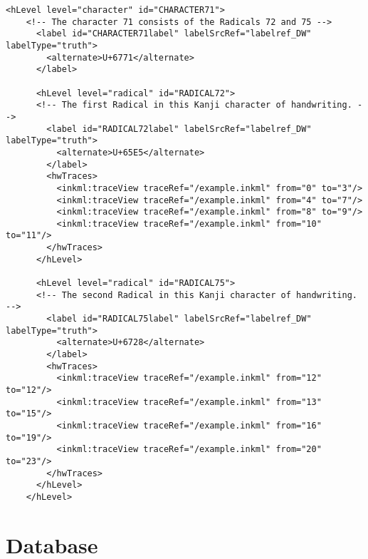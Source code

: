 \begin{xmlcode}
  \begin{lstlisting}[emph={hLevel,hwTraces,label,alternative},
                     emphstyle=\color{blue}\textbf,
                     emph={[2]level,labelSrcRef,labelType,traceRef,from,to},
                     emphstyle={[2]\color{red}},
                     caption={A sample of how a stroke could be represented},
                     label=lst:charaterdataformat]
    <hLevel level="character" id="CHARACTER71">
    <!-- The character 71 consists of the Radicals 72 and 75 -->
      <label id="CHARACTER71label" labelSrcRef="labelref_DW" labelType="truth">
        <alternate>U+6771</alternate>
      </label>

      <hLevel level="radical" id="RADICAL72">
      <!-- The first Radical in this Kanji character of handwriting. -->
        <label id="RADICAL72label" labelSrcRef="labelref_DW" labelType="truth">
          <alternate>U+65E5</alternate>
        </label>
        <hwTraces>
          <inkml:traceView traceRef="/example.inkml" from="0" to="3"/>
          <inkml:traceView traceRef="/example.inkml" from="4" to="7"/>
          <inkml:traceView traceRef="/example.inkml" from="8" to="9"/>
          <inkml:traceView traceRef="/example.inkml" from="10" to="11"/>
        </hwTraces>
      </hLevel>

      <hLevel level="radical" id="RADICAL75">
      <!-- The second Radical in this Kanji character of handwriting. -->
        <label id="RADICAL75label" labelSrcRef="labelref_DW" labelType="truth">
          <alternate>U+6728</alternate>
        </label>
        <hwTraces>
          <inkml:traceView traceRef="/example.inkml" from="12" to="12"/>
          <inkml:traceView traceRef="/example.inkml" from="13" to="15"/>
          <inkml:traceView traceRef="/example.inkml" from="16" to="19"/>
          <inkml:traceView traceRef="/example.inkml" from="20" to="23"/>
        </hwTraces>
      </hLevel>
    </hLevel>
  \end{lstlisting}
\end{xmlcode}

\section{Database}
\label{sec:hwre:database}


